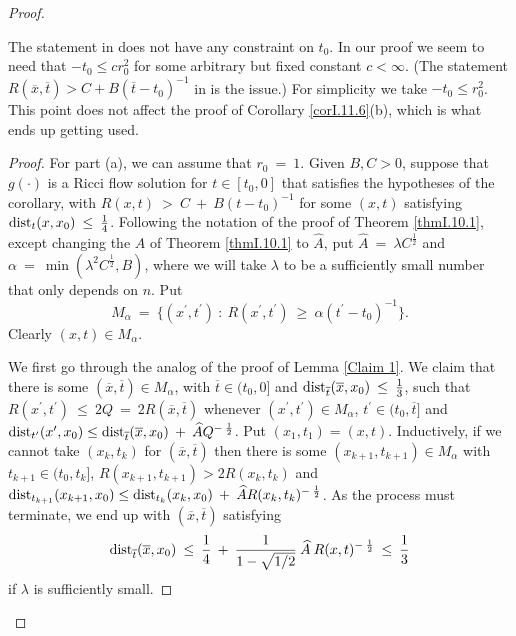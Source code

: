 \begin{proof}
\begin{remark}
The statement in \cite[Corollary 11.6(a)]{Perelman}
does not have any constraint on $t_0$.
In our proof we seem to need that $-t_0 \le c r_0^2$ for some arbitrary
but fixed
constant $c < \infty$.
(The statement $R(\overline{x}, \overline{t}) >
C + B (\overline{t} - t_0)^{-1}$ in
\cite[Proof of Corollary 11.6(a)]{Perelman} is the issue.)
For simplicity we take
$- t_0 \le r_0^2$. This point does not affect the proof of
Corollary \ref{corI.11.6}(b), which is what ends up getting used.
\end{remark}
\begin{proof}
For part (a), we can assume that $r_0 \: = \: 1$. Given $B,C > 0$,
suppose that $g(\cdot)$ is a Ricci flow solution for
$t \in [t_0, 0]$ that satisfies the hypotheses of the corollary,
with $R(x, t) \: > \: C \: + \: B(t - t_0)^{-1}$
for some $(x, t)$ satisfying $\operatorname{dist}_t(x, x_0) \: \le \: \frac{1}{4}$.
Following the notation of the proof of Theorem \ref{thmI.10.1},
except changing the $A$ of Theorem \ref{thmI.10.1} to
$\widehat{A}$,
put $\widehat{A} \: = \: \lambda C^{\frac12}$ and $\alpha \: = \:
\min(\lambda^2 C^{\frac12}, B)$, where we will take $\lambda$ to be a
sufficiently small number that only depends on $n$. Put
\begin{equation}
M_\alpha \: = \: \{(x^\prime, t^\prime) \: : \: R(x^\prime, t^\prime) \: \ge \:
\alpha (t^\prime-t_0)^{-1}\}.
\end{equation}
Clearly $(x, t) \in M_\alpha$.

We first go through the analog of the proof of Lemma \ref{Claim 1}.
We claim that there is some $(\overline{x}, \overline{t}) \in
M_\alpha$, with $\overline{t} \in (t_0, 0]$ and
$\operatorname{dist}_{\overline{t}}(\overline{x}, x_0) \: \le \: \frac13$, such that
$R(x^\prime, t^\prime) \: \le \: 2 Q \: =
\: 2R(\overline{x}, \overline{t})$ whenever
$(x^\prime, t^\prime) \in M_\alpha$, $t^\prime \in (t_0, \overline{t}]$
and $\operatorname{dist}_{t^\prime}(x^\prime, x_0) \le
\operatorname{dist}_{\overline{t}}(\overline{x}, x_0) \: + \: \widehat{A}Q^{- \: \frac12}$.
Put $(x_1, t_1) = (x, t)$. Inductively, if we cannot take
$(x_k, t_k)$ for $(\overline{x}, \overline{t})$ then there is some
$(x_{k+1}, t_{k+1}) \in M_\alpha$ with
$t_{k+1} \in (t_0, t_k]$,
$R(x_{k+1}, t_{k+1}) > 2
R(x_k, t_k)$ and $\operatorname{dist}_{t_{k+1}}(x_{k+1}, x_0) \le
\operatorname{dist}_{t_k}(x_k, x_0) \: + \: \widehat{A}R(x_k, t_k)^{- \: \frac12}$. As the
process must terminate, we end up with $(\overline{x}, \overline{t})$
satisfying
\begin{equation}
\operatorname{dist}_{\overline{t}}(\overline{x}, x_0) \: \le \: \frac14
\: + \: \frac{1}{1-\sqrt{1/2}} \: \widehat{A} \: R(x,t)^{- \: \frac12}
\: \le \: \frac13
\end{equation}
if $\lambda$ is sufficiently small.


\end{proof}
\end{proof}
